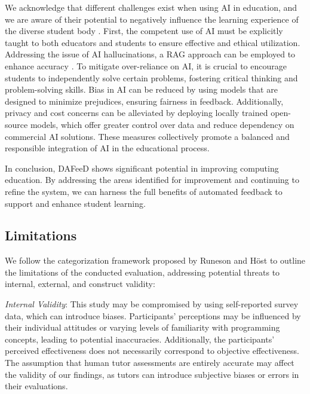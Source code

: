 \documentclass[sigconf,screen,review,anonymous]{acmart}
\begin{document}
We acknowledge that different challenges exist when using AI in education, and we are aware of their potential to negatively influence the learning experience of the diverse student body \cite{kasneci:2023:ChatGPTGoodOpportunitiesa}.
First, the competent use of AI must be explicitly taught to both educators and students to ensure effective and ethical utilization.
Addressing the issue of AI hallucinations, a RAG approach can be employed to enhance accuracy \cite{gao:2024:RetrievalAugmentedGenerationLarge}.
To mitigate over-reliance on AI, it is crucial to encourage students to independently solve certain problems, fostering critical thinking and problem-solving skills.
Bias in AI can be reduced by using models that are designed to minimize prejudices, ensuring fairness in feedback.
Additionally, privacy and cost concerns can be alleviated by deploying locally trained open-source models, which offer greater control over data and reduce dependency on commercial AI solutions.
These measures collectively promote a balanced and responsible integration of AI in the educational process.

In conclusion, DAFeeD shows significant potential in improving computing education.
By addressing the areas identified for improvement and continuing to refine the system, we can harness the full benefits of automated feedback to support and enhance student learning.


\subsection{Limitations}
We follow the categorization framework proposed by Runeson and Höst \cite{runeson:2009:GuidelinesConductingReporting} to outline the limitations of the conducted evaluation, addressing potential threats to internal, external, and construct validity:

\textit{Internal Validity}: This study may be compromised by using self-reported survey data, which can introduce biases. 
Participants' perceptions may be influenced by their individual attitudes or varying levels of familiarity with programming concepts, leading to potential inaccuracies.
Additionally, the participants' perceived effectiveness does not necessarily correspond to objective effectiveness.
The assumption that human tutor assessments are entirely accurate may affect the validity of our findings, as tutors can introduce subjective biases or errors in their evaluations.
\end{document}
